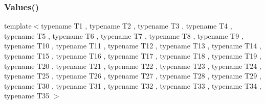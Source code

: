 \mbox{\label{namespacetesting_a8746425c9d27e46ea5bc5fd77586bc2a}} 
\subsubsection{\texorpdfstring{Values()}{Values()}\hspace{0.1cm}{\footnotesize\ttfamily [35/50]}}
{\footnotesize\ttfamily template$<$typename T1 , typename T2 , typename T3 , typename T4 , typename T5 , typename T6 , typename T7 , typename T8 , typename T9 , typename T10 , typename T11 , typename T12 , typename T13 , typename T14 , typename T15 , typename T16 , typename T17 , typename T18 , typename T19 , typename T20 , typename T21 , typename T22 , typename T23 , typename T24 , typename T25 , typename T26 , typename T27 , typename T28 , typename T29 , typename T30 , typename T31 , typename T32 , typename T33 , typename T34 , typename T35 $>$ \\
}
